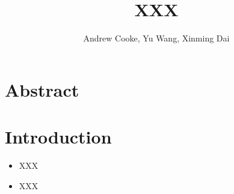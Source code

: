 \documentclass{article}
\title{XXX} %
\author{Andrew Cooke, Yu Wang, Xinming Dai}
\begin{document}
\maketitle

\section{Abstract}
	
\section{Introduction}



\begin{itemize}
  	\item XXX
	\item XXX
\end{itemize}


\end{document}
